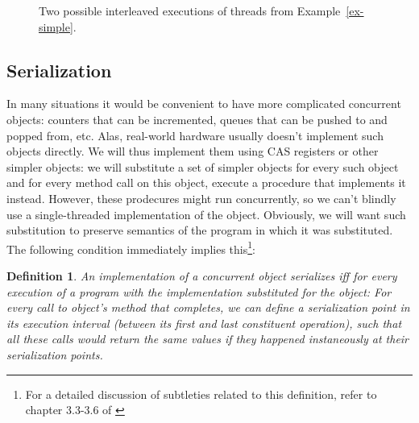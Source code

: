 \documentclass[a4paper,11pt]{article}
\newcommand{\atomic}[4]{\node(lab#1) at (#3,-#4+0.5) {#2};\draw (#3,-#4-0.1) to (lab#1);\node[inner sep=0pt](#1) at (#3,-#4) {};}
\newtheorem{definition}{Definition}
\newcommand{\fn}[1]{\textsc{#1}}
\begin{document}
\begin{figure}[!h]

\caption{Two possible interleaved executions of threads from Example~\ref{ex-simple}.}
\label{fig-ex-simple}
\end{figure}

\subsection{Serialization}
In many situations it would be convenient to have more complicated concurrent objects: counters that can be incremented,
queues that can be pushed to and popped from, etc. Alas, real-world hardware usually doesn't implement such objects
directly. We will thus implement them using CAS registers or other simpler objects: we will substitute a set of simpler objects for every such object and for every method call on this object, execute a procedure that implements it instead.
However, these prodecures might run concurrently, so we can't blindly use a single-threaded implementation of the object.
Obviously, we will want such substitution to preserve semantics of the program in which it was substituted. The following condition immediately implies
this\footnote{For a detailed discussion of subtleties related to this definition, refer to chapter 3.3-3.6 of \cite{TheArt}}:

\begin{definition}
An implementation of a concurrent object \emph{serializes} iff for every execution of a program with the implementation
substituted for the object:
For every call to object's method that completes, we can define a \emph{serialization point} in its execution
interval (between its first and last constituent operation), such that all these calls would return the same values if they happened instaneously at their serialization
points.
\end{definition}
\end{document}
